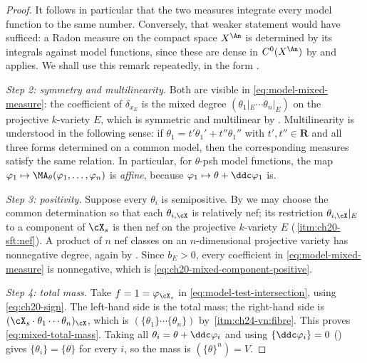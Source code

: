 \begin{proof}
It follows in particular that the two measures integrate every model
function to the same number.  Conversely, that weaker statement would have
sufficed: a Radon measure on the compact space $X^{\An}$ is determined by
its integrals against model functions, since these are dense in
$C^0(X^{\An})$ by  and
 applies.  We shall use this remark repeatedly,
in the form .

\emph{Step 2: symmetry and multilinearity.}  Both are visible in
\eqref{eq:model-mixed-measure}: the coefficient of $\delta_{x_E}$ is the
mixed degree $(\theta_{1}|_E\cdots\theta_{n}|_E)$ on the projective
$k$-variety $E$, which is symmetric and multilinear by
.  Multilinearity is understood in the
following sense: if $\theta_1=t'\theta_1'+t''\theta_1''$ with
$t',t''\in\mathbf R$ and all three forms determined on a common model,
then the corresponding measures satisfy the same relation.  In particular,
for $\theta$-psh model functions, the map
$\varphi_1\mapsto\MA_\theta(\varphi_1,\ldots,\varphi_n)$ is \emph{affine},
because $\varphi_1\mapsto\theta+\ddc\varphi_1$ is.

\emph{Step 3: positivity.}  Suppose every $\theta_i$ is semipositive.  By
 we may choose the common
determination so that each $\theta_{i,\cX}$ is relatively nef; its
restriction $\theta_{i,\cX}|_E$ to a component of $\cX_s$ is then nef on
the projective $k$-variety $E$
(\,\cref{itm:ch20-sft:nef}).  A product of
$n$ nef classes on an $n$-dimensional projective variety has nonnegative
degree, again by .  Since $b_E>0$, every
coefficient in \eqref{eq:model-mixed-measure} is nonnegative, which is
\eqref{eq:ch20-mixed-component-positive}.

\emph{Step 4: total mass.}  Take $f=1=\varphi_{\cX_s}$ in
\eqref{eq:model-test-intersection}, using \eqref{eq:ch20-sign}.  The
left-hand side is the total mass; the right-hand side is
$(\cX_s\cdot\theta_1\cdots\theta_n)_{\cX}$, which is
$(\{\theta_1\}\cdots\{\theta_n\})$ by
\,\cref{itm:ch24-vn:fibre}.  This proves
\eqref{eq:mixed-total-mass}.  Taking all $\theta_i=\theta+\ddc\varphi_i$
and using $\{\ddc\varphi_i\}=0$ () gives
$\{\theta_i\}=\{\theta\}$ for every $i$, so the mass is
$(\{\theta\}^n)=V$.
\end{proof}

